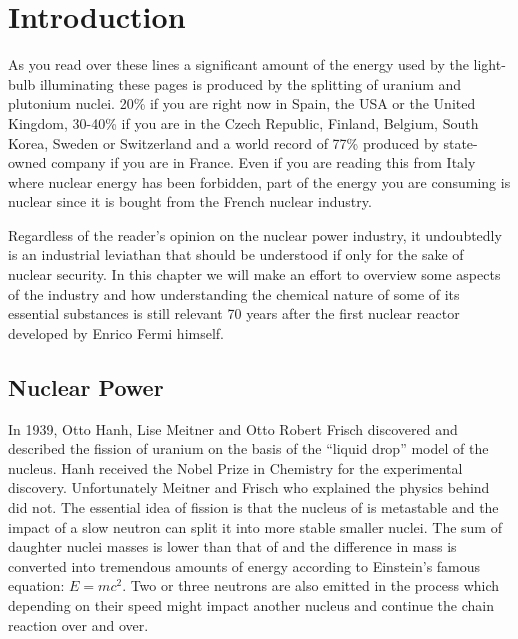 \setcounter{chapter}{0}
\chapter[Introduction]{Introduction}\label{c1:intro}
As you read over these lines a significant amount of the energy used by the light-bulb 
illuminating these pages is produced by the splitting of 
uranium and plutonium nuclei. 20\% if you are right now in Spain, the USA or 
the United Kingdom, 30-40\% if you are in the Czech Republic, Finland, Belgium, South Korea, 
Sweden or Switzerland and a world record of 77\% produced by state-owned company if you are 
in France.\cite{NuclearElectricEnergy} Even if you are reading this from Italy where nuclear 
energy has been forbidden, part of the energy you are consuming is nuclear since it is bought from 
the French nuclear 
industry.

Regardless of 
the reader's opinion on the nuclear power industry, it undoubtedly is an industrial leviathan 
that should be understood if only for the sake of nuclear security.  In this chapter we will 
make an effort to overview some aspects of the industry and how understanding the 
chemical nature of some of its essential substances is still relevant 70 years after the first 
nuclear reactor developed by Enrico Fermi himself. 

\section{Nuclear Power}

In 1939, Otto Hanh, Lise Meitner  and Otto Robert Frisch discovered and described the fission 
of uranium on the basis of the ``liquid drop'' model of the nucleus. Hanh
received the Nobel Prize in Chemistry for the experimental discovery. Unfortunately Meitner 
and Frisch who explained the physics behind did not. The essential idea of fission is that the 
nucleus of \ufis is metastable and the impact of a slow neutron can split it into more stable 
smaller 
nuclei. The sum of daughter nuclei masses is lower than that of \ufis \newline and 
the difference in mass is converted into tremendous amounts of energy according to Einstein's 
famous equation: $E=mc^2$. Two or three neutrons are also emitted in the process which 
depending on their speed might impact another \ufis nucleus and continue the chain reaction 
over and over.

